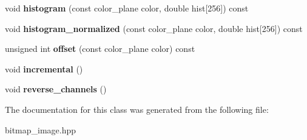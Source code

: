 \begin{DoxyCompactItemize}
void {\bfseries histogram} (const color\+\_\+plane color, double hist\mbox{[}256\mbox{]}) const
\item 
\mbox{\label{classbitmap__image_a65642b49c0ec89f9a466b2fb674da390}} 
void {\bfseries histogram\+\_\+normalized} (const color\+\_\+plane color, double hist\mbox{[}256\mbox{]}) const
\item 
\mbox{\label{classbitmap__image_ae10a8247b828dcc3b26e75d8cbbab646}} 
unsigned int {\bfseries offset} (const color\+\_\+plane color) const
\item 
\mbox{\label{classbitmap__image_a082eca47acefef7a6cf5b6d89b10cd90}} 
void {\bfseries incremental} ()
\item 
\mbox{\label{classbitmap__image_a493ed1dd1877f8ee5c9af1f363a70d39}} 
void {\bfseries reverse\+\_\+channels} ()
\end{DoxyCompactItemize}


The documentation for this class was generated from the following file\+:\begin{DoxyCompactItemize}
\item 
bitmap\+\_\+image.\+hpp\end{DoxyCompactItemize}
